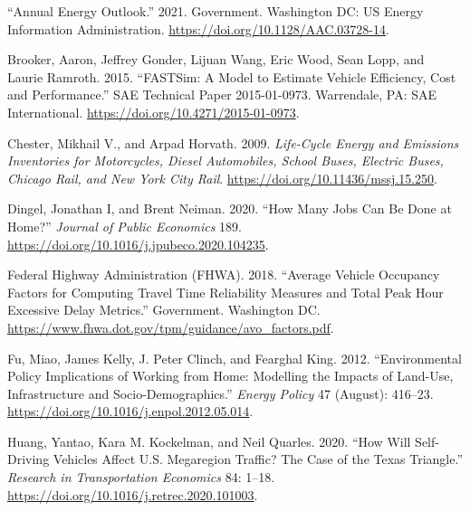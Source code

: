 \documentclass[
]{book}
\newlength{\cslhangindent}
\newlength{\cslentryspacingunit} %
\newenvironment{CSLReferences}[2] %
 {%
  \setlength{\parindent}{0pt}
  \ifodd #1
  \let\oldpar\par
  \def\par{\hangindent=\cslhangindent\oldpar}
  \fi
  \setlength{\parskip}{#2\cslentryspacingunit}
 }%
 {}
\begin{document}
\hypertarget{refs}{}
\begin{CSLReferences}{1}{0}
\leavevmode{}%
{``Annual {Energy Outlook}.''} 2021. Government. {Washington DC}: {US Energy Information Administration}. \url{https://doi.org/10.1128/AAC.03728-14}.

\leavevmode{}%
Brooker, Aaron, Jeffrey Gonder, Lijuan Wang, Eric Wood, Sean Lopp, and Laurie Ramroth. 2015. {``{FASTSim}: {A Model} to {Estimate Vehicle Efficiency}, {Cost} and {Performance}.''} SAE Technical Paper 2015-01-0973. {Warrendale, PA}: {SAE International}. \url{https://doi.org/10.4271/2015-01-0973}.

\leavevmode{}%
Chester, Mikhail V., and Arpad Horvath. 2009. \emph{Life-Cycle Energy and Emissions Inventories for Motorcycles, Diesel Automobiles, School Buses, Electric Buses, Chicago Rail, and New York City Rail}. \url{https://doi.org/10.11436/mssj.15.250}.

\leavevmode{}%
Dingel, Jonathan I, and Brent Neiman. 2020. {``How Many Jobs Can Be Done at Home?''} \emph{Journal of Public Economics} 189. \url{https://doi.org/10.1016/j.jpubeco.2020.104235}.

\leavevmode{}%
Federal Highway Administration (FHWA). 2018. {``Average {Vehicle Occupancy Factors} for {Computing Travel Time Reliability Measures} and {Total Peak Hour Excessive Delay Metrics}.''} Government. {Washington DC}. \url{https://www.fhwa.dot.gov/tpm/guidance/avo_factors.pdf}.

\leavevmode{}%
Fu, Miao, James Kelly, J. Peter Clinch, and Fearghal King. 2012. {``Environmental Policy Implications of Working from Home: {Modelling} the Impacts of Land-Use, Infrastructure and Socio-Demographics.''} \emph{Energy Policy} 47 (August): 416--23. \url{https://doi.org/10.1016/j.enpol.2012.05.014}.

\leavevmode{}%
Huang, Yantao, Kara M. Kockelman, and Neil Quarles. 2020. {``How Will Self-Driving Vehicles Affect {U}.{S}. Megaregion Traffic? {The} Case of the {Texas Triangle}.''} \emph{Research in Transportation Economics} 84: 1--18. \url{https://doi.org/10.1016/j.retrec.2020.101003}.


\end{CSLReferences}
\end{document}

